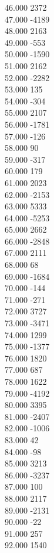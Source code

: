 { 46.000	2372 \\
 47.000	-4189 \\
 48.000	2163 \\
 49.000	-553 \\
 50.000	-1590 \\
 51.000	2162 \\
 52.000	-2282 \\
 53.000	135 \\
 54.000	-304 \\
 55.000	2107 \\
 56.000	-1781 \\
 57.000	-126 \\
 58.000	90 \\
 59.000	-317 \\
 60.000	179 \\
 61.000	2023 \\
 62.000	-2153 \\
 63.000	5333 \\
 64.000	-5253 \\
 65.000	2662 \\
 66.000	-2848 \\
 67.000	2111 \\
 68.000	68 \\
 69.000	-1684 \\
 70.000	-144 \\
 71.000	-271 \\
 72.000	3727 \\
 73.000	-3471 \\
 74.000	1299 \\
 75.000	-1377 \\
 76.000	1820 \\
 77.000	687 \\
 78.000	1622 \\
 79.000	-4192 \\
 80.000	3395 \\
 81.000	-2407 \\
 82.000	-1006 \\
 83.000	42 \\
 84.000	-98 \\
 85.000	3213 \\
 86.000	-3237 \\
 87.000	100 \\
 88.000	2117 \\
 89.000	-2131 \\
 90.000	-22 \\
 91.000	257 \\
 92.000	1540 \\
}
